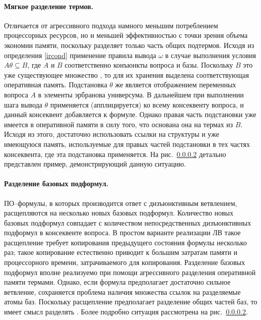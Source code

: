 \paragraph{Мягкое разделение термов.} Отличается от агрессивного подхода намного меньшим потреблением процессорных ресурсов, но и меньшей эффективностью с точки зрения объема экономии памяти,
поскольку разделяет только часть общих подтермов. Исходя из определения \ref{ircond} применение правила вывода $\omega$  в случае выполнения условия $A\theta \subseteq B$, где $A$ и $B$ соответственно конъюнкты вопроса и базы. Поскольку $B$ это уже существующее множество , то для их хранения выделена соответствующая оперативная память. Подстановка $\theta$ же является отображением переменных вопроса $A$ в элементы эрбранова универсума. В дальнейшем при выполнении шага вывода $\theta$ применяется (апплицируется) ко всему консеквенту вопроса, и данный консеквент добавляется к формуле. Однако правая часть подстановки уже имеется в оперативной памяти в силу того, что основана она на термах из $B$. Исходя из этого, достаточно использовать ссылки на структуры и уже имеющуюся память, используемые для правых частей подстановки в тех частях консеквента, где эта подстановка применяется. На рис.~\ref{} детально представлен пример, демонстрирующий данную ситуацию.

\paragraph{Разделение базовых подформул.} ПО--формулы, в которых производится ответ  с дизъюнктивным ветвлением, расщепляются на несколько новых базовых подформул. Количество новых базовых подформул совпадает с количеством непосредственных дизъюнктивных подформул в консеквенте вопроса. В простом варианте реализации ЛВ такое расщепление требует копирования предыдущего состояния формулы несколько раз; такое копирование естественно приводит к большим затратам памяти и процессорного времени, затрачиваемого для копирования. Разделение базовых подформул вполне реализуемо при помощи агрессивного разделения оперативной памяти термами. Однако, если формула предполагает достаточно сильное ветвление, сохраняется проблема наличия множества ссылок на разделяемые атомы баз. Поскольку расщепление предполагает разделение общих частей баз, то имеет смысл разделять . Более подробно ситуация рассмотрена на рис.~\ref{}.

